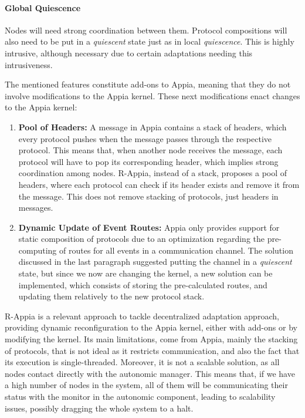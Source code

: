 \paragraph{Global Quiescence} Nodes will need strong coordination between them. Protocol compositions will also need to be put in a \textit{quiescent} state just as in local \textit{quiescence}. This is highly intrusive, although necessary due to certain adaptations needing this intrusiveness.
\par The mentioned features constitute add-ons to Appia, meaning that they do not involve modifications to the Appia kernel. These next modifications enact changes to the Appia kernel:
\begin{enumerate}
	\item \textbf{Pool of Headers:} A message in Appia contains a stack of headers, which every protocol pushes when the message passes through the respective protocol. This means that, when another node receives the message, each protocol will have to pop its corresponding header, which implies strong coordination among nodes. R-Appia, instead of a stack, proposes a pool of headers, where each protocol can check if its header exists and remove it from the message. This does not remove stacking of protocols, just headers in messages.
	\item \textbf{Dynamic Update of Event Routes:} Appia only provides support for static composition of protocols due to an optimization regarding the pre-computing of routes for all events in a communication channel. The solution discussed in the last paragraph suggested putting the channel in a \textit{quiescent} state, but since we now are changing the kernel, a new solution can be implemented, which consists of storing the pre-calculated routes, and updating them relatively to the new protocol stack.
\end{enumerate}
\par R-Appia is a relevant approach to tackle decentralized adaptation approach, providing dynamic reconfiguration to the Appia kernel, either with add-ons or by modifying the kernel. Its main limitations, come from Appia, mainly the stacking of protocols, that is not ideal as it restricts communication, and also the fact that its execution is single-threaded. Moreover, it is not a scalable solution, as all nodes contact directly with the autonomic manager. This means that, if we have a high number of nodes in the system, all of them will be communicating their status with the monitor in the autonomic component, leading to scalability issues, possibly dragging the whole system to a halt.
%
%
%
